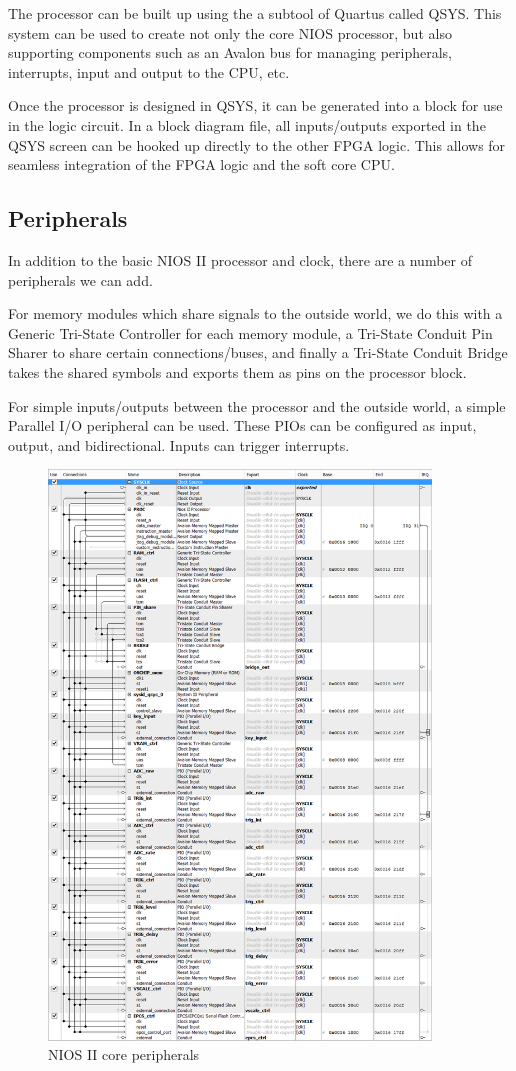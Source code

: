 The processor can be built up using the a subtool of Quartus called QSYS. This system can be used to create not only the core NIOS processor, but also supporting components such as an Avalon bus for managing peripherals, interrupts, input and output to the CPU, etc.

Once the processor is designed in QSYS, it can be generated into a block for use in the logic circuit. In a block diagram file, all inputs/outputs exported in the QSYS screen can be hooked up directly to the other FPGA logic. This allows for seamless integration of the FPGA logic and the soft core CPU.

\subsection{Peripherals}

In addition to the basic NIOS II processor and clock, there are a number of peripherals we can add.

For memory modules which share signals to the outside world, we do this with a Generic Tri-State Controller for each memory module, a Tri-State Conduit Pin Sharer to share certain connections/buses, and finally a Tri-State Conduit Bridge takes the shared symbols and exports them as pins on the processor block.

For simple inputs/outputs between the processor and the outside world, a simple Parallel I/O peripheral can be used. These PIOs can be configured as input, output, and bidirectional. Inputs can trigger interrupts.

\begin{figure}[ht!]
    \centering
    \includegraphics[width=4in]{fpga_logic/proc_periph.png}
		\caption{NIOS II core peripherals}
\end{figure}

